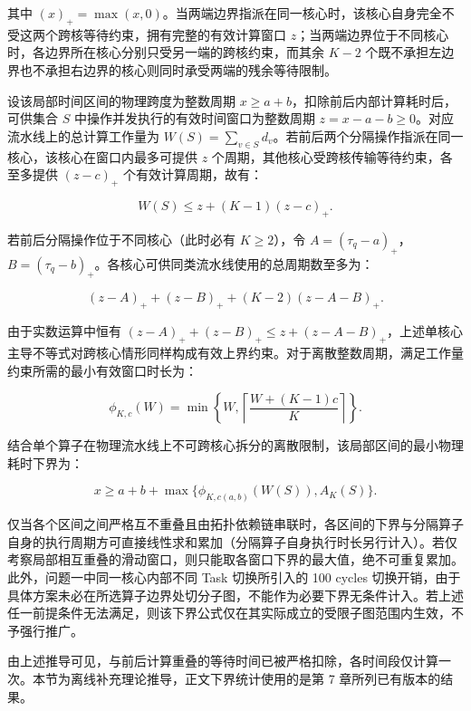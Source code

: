 \documentclass[anonymous,notoc]{gmcm2026}
\begin{document}
其中 \((x)_+ = \max(x, 0)\)。当两端边界指派在同一核心时，该核心自身完全不受这两个跨核等待约束，拥有完整的有效计算窗口 \(z\)；当两端边界位于不同核心时，各边界所在核心分别只受另一端的跨核约束，而其余 \(K - 2\) 个既不承担左边界也不承担右边界的核心则同时承受两端的残余等待限制。

设该局部时间区间的物理跨度为整数周期 \(x \ge a + b\)，扣除前后内部计算耗时后，可供集合 \(S\) 中操作并发执行的有效时间窗口为整数周期 \(z = x - a - b \ge 0\)。对应流水线上的总计算工作量为 \(W(S) = \sum_{v \in S} d_v\)。若前后两个分隔操作指派在同一核心，该核心在窗口内最多可提供 \(z\) 个周期，其他核心受跨核传输等待约束，各至多提供 \((z - c)_+\) 个有效计算周期，故有：

\begin{equation}
W(S) \le z + (K - 1)(z - c)_+.
\end{equation}

若前后分隔操作位于不同核心（此时必有 \(K \ge 2\)），令 \(A = (\tau_q - a)_+\)，\(B = (\tau_q - b)_+\)。各核心可供同类流水线使用的总周期数至多为：

\begin{equation}
(z - A)_+ + (z - B)_+ + (K - 2)(z - A - B)_+.
\end{equation}

由于实数运算中恒有 \((z - A)_+ + (z - B)_+ \le z + (z - A - B)_+\)，上述单核心主导不等式对跨核心情形同样构成有效上界约束。对于离散整数周期，满足工作量约束所需的最小有效窗口时长为：

\begin{equation}
\phi_{K,c}(W) = \min\left\{W, \left\lceil\frac{W + (K - 1)c}{K}\right\rceil\right\}.
\end{equation}

结合单个算子在物理流水线上不可跨核心拆分的离散限制，该局部区间的最小物理耗时下界为：

\begin{equation}
x \ge a + b + \max\{\phi_{K, c(a,b)}(W(S)), A_K(S)\}.
\end{equation}

仅当各个区间之间严格互不重叠且由拓扑依赖链串联时，各区间的下界与分隔算子自身的执行周期方可直接线性求和累加（分隔算子自身执行时长另行计入）。若仅考察局部相互重叠的滑动窗口，则只能取各窗口下界的最大值，绝不可重复累加。此外，问题一中同一核心内部不同 Task 切换所引入的 100 cycles 切换开销，由于具体方案未必在所选算子边界处切分子图，不能作为必要下界无条件计入。若上述任一前提条件无法满足，则该下界公式仅在其实际成立的受限子图范围内生效，不予强行推广。

由上述推导可见，与前后计算重叠的等待时间已被严格扣除，各时间段仅计算一次。本节为离线补充理论推导，正文下界统计使用的是第 7 章所列已有版本的结果。
\end{document}
